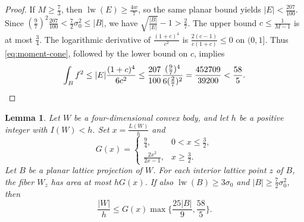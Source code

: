 \documentclass[reqno, 11pt]{article}
\numberwithin{equation}{section}
\newtheorem{lemma}[lemma]{Lemma}
\theoremstyle{definition}
\DeclareMathOperator{\lw}{lw}
\begin{document}
\begin{proof}
If $M\ge\frac{7}{3}$, then $\lw(E)\ge\frac{4w}{7}$, so the same
planar bound yields $|E|<\frac{207}{100}$. Since
$(\frac{9}{7})^2\frac{207}{100}<\frac{7}{2}\sigma_0^2\le |B|$,
we have $\sqrt{\frac{|B|}{|E|}}-1>\frac{2}{7}$. The upper bound
$c\le\frac{1}{M-1}$ is at most $\frac{3}{4}$. The logarithmic
derivative of $\frac{(1+c)^4}{c^2}$ is
$\frac{2(c-1)}{c(1+c)}\le0$ on $(0,1]$. Thus \eqref{eq:moment-cone},
followed by the lower bound on $c$, implies
\[
 \int_B f^2\le |E|\frac{(1+c)^4}{6c^2}
 \le\frac{207}{100}\frac{(\frac{9}{7})^4}{6(\frac{2}{7})^2}
 =\frac{452709}{39200}<\frac{58}{5}. \qedhere
\]
\end{proof}

\begin{lemma}
Let $W$ be a four-dimensional convex body, and let $h$ be a positive
integer with $I(W)<h$. Set $x=\frac{L(W)}{h}$ and
\[
 G(x)=
 \begin{cases}
       \frac{9}{4},&0<x\le\frac{3}{2},\\
       \frac{2x^2}{2x-1},&x\ge\frac{3}{2} .
 \end{cases}
\]
Let $B$ be a planar lattice projection of $W$. For each interior
lattice point $z$ of $B$, the fiber $W_z$ has area at most $hG(x)$.
If also $\lw(B)\ge3\sigma_0$ and $|B|\ge\frac{7}{2}\sigma_0^2$, then
\begin{equation}\label{eq:four-fiber-area}
             \frac{|W|}{h}\le G(x)\max\{\frac{25|B|}{9},\frac{58}{5}\}.
\end{equation}
\end{lemma}
\end{document}
